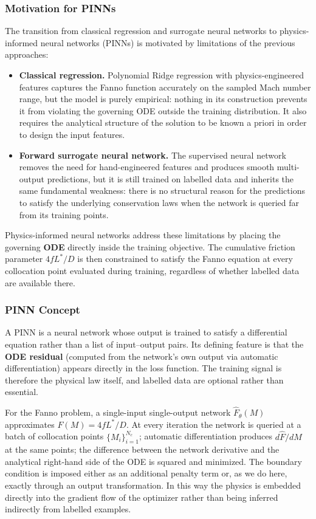 \documentclass[11pt,a4paper]{report}
\begin{document}
\subsubsection{Motivation for PINNs}
The transition from classical regression and surrogate neural networks to physics-informed neural networks (PINNs) is motivated by limitations of the previous approaches:

\begin{itemize}
    \item \textbf{Classical regression.} Polynomial Ridge regression with physics-engineered features captures the Fanno function accurately on the sampled Mach number range, but the model is purely empirical: nothing in its construction prevents it from violating the governing ODE outside the training distribution. It also requires the analytical structure of the solution to be known a priori in order to design the input features.
    \item \textbf{Forward surrogate neural network.} The supervised neural network removes the need for hand-engineered features and produces smooth multi-output predictions, but it is still trained on labelled data and inherits the same fundamental weakness: there is no structural reason for the predictions to satisfy the underlying conservation laws when the network is queried far from its training points.
\end{itemize}

Physics-informed neural networks address these limitations by placing the governing \textbf{ODE} directly inside the training objective. The cumulative friction parameter $4 f L^{*}/D$ is then constrained to satisfy the Fanno equation at every collocation point evaluated during training, regardless of whether labelled data are available there.

\subsubsection{PINN Concept}
A PINN is a neural network whose output is trained to satisfy a differential equation rather than a list of input--output pairs. Its defining feature is that the \textbf{ODE residual} (computed from the network's own output via automatic differentiation) appears directly in the loss function. The training signal is therefore the physical law itself, and labelled data are optional rather than essential.

For the Fanno problem, a single-input single-output network $\hat{F}_{\theta}(M)$ approximates $F(M) = 4fL^*/D$. At every iteration the network is queried at a batch of collocation points $\{M_i\}_{i=1}^{N_c}$; automatic differentiation produces $d\hat{F}/dM$ at the same points; the difference between the network derivative and the analytical right-hand side of the ODE is squared and minimized. The boundary condition is imposed either as an additional penalty term or, as we do here, exactly through an output transformation. In this way the physics is embedded directly into the gradient flow of the optimizer rather than being inferred indirectly from labelled examples.
\end{document}
